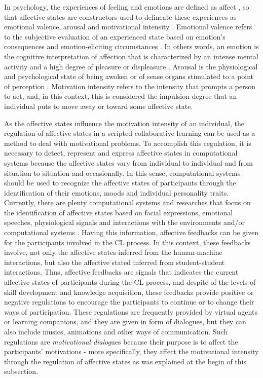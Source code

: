 In psychology, the experiences of feeling and emotions are defined as affect \cite{HoggAbrams2007}, so that affective states are constructors used to delineate these experiences as emotional valence, arousal and motivational intensity \cite{Harmon-JonesGablePrice2013}.
Emotional valence refers to the subjective evaluation of an experienced state based on emotion's consequences and emotion-eliciting circumstances \cite{Harmon-JonesHarmon-JonesAmodioGable2011}.
In others words, an emotion is the cognitive interpretation of affection that is characterized by an intense mental activity and a high degree of pleasure or displeasure \cite{Cabanac2002}.
Arousal is the physiological and psychological state of being awoken or of sense organs stimulated to a point of perception \cite{WikipediaArousal2018,dosSantosBittencourtIsotaniDermevalMarquesSilveira2018}.
Motivation intensity refers to the intensity that prompts a person to act, and, in this context, this is considered the impulsion degree that an individual puts to move away or toward some affective state.

As the affective states influence the motivation intensity of an individual, the regulation of affective states in a scripted collaborative learning can be used as a method to deal with motivational problems. 
To accomplish this regulation, it is necessary to detect, represent and express affective states in computational systems because the affective states vary from individual to individual and from situation to situation and occasionally.
In this sense, computational systems should be used to recognize the affective states of participants through the identification of their emotions, moods and individual personality traits.
Currently, there are plenty computational systems and researches that focus on the identification of affective states based on facial expressions, emotional speeches, physiological signals and interactions with the environments and/or computational systems \cite{Picard2000,TaoTan2005,WuHuangHwang2016,ReisIsotaniRodriguezLyraJaquesBittencourt2018}.
Having this information, affective feedbacks can be given for the participants involved in the CL process. 
In this context, these feedbacks involve, not only the affective states inferred from the human-machine interactions, but also the affective stated inferred from student-student interactions.
Thus, affective feedbacks are signals that indicates the current affective states of participants during the CL process, and despite of the levels of skill development and knowledge acquisition, these feedbacks provide positive or negative regulations to encourage the participants to continue or to change their ways of participation.
These regulations are frequently provided by virtual agents or learning companions, and they are given in form of dialogues, but they can also include musics, animations and other ways of communication.
Such regulations are \emph{motivational dialog}ues because their purpose is to affect the participants' motivations - more specifically, they affect the motivational intensity through the regulation of affective states as was explained at the begin of this subsection.

